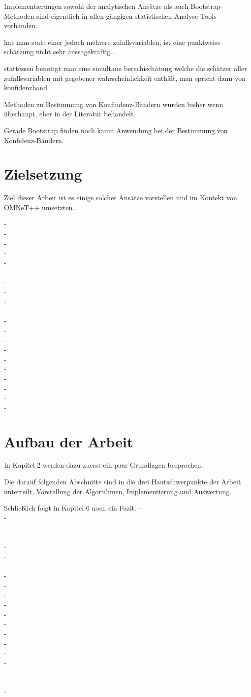 Implementierungen sowohl der analytischen Ansätze als auch Bootstrap-Methoden sind eigentlich in allen gängigen statistischen Analyse-Tools vorhanden. 

hat man statt einer jedoch mehrere zufallsvariablen, ist eine punktweise schätzung nicht sehr aussagekräftig...

stattessen benötigt man eine simultane berechischätung welche die schätzer aller zufallsvariablen mit gegebener wahrscheinlichkeit enthält, man spricht dann von konfidenzband

Methoden zu Bestimmung von Konfindenz-Bändern wurden bisher wenn überhaupt, eher in der Literatur behandelt.

Gerade Bootstrap finden noch kaum Anwendung bei der Bestimmung von Konfidenz-Bändern.

\section{Zielsetzung}
Ziel dieser Arbeit ist es einige solcher Ansätze vorstellen und im Kontekt von OMNeT++ umsetzten.


- \\
- \\
- \\
- \\
- \\
- \\
- \\
- \\
- \\
- \\
- \\
- \\
- \\
- \\
- \\
- \\
- \\
- \\
- \\
- \\

\section{Aufbau der Arbeit}
In Kapitel 2 werden dazu zuerst ein paar Grundlagen besprochen.

Die darauf folgenden Abschnitte sind in die drei Hautschwerpunkte der Arbeit unterteilt, Vorstellung der Algorithmen, Implementierung und Auswertung.

Schließlich folgt in Kapitel 6 noch ein Fazit.
- \\
- \\
- \\
- \\
- \\
- \\
- \\
- \\
- \\
- \\
- \\
- \\
- \\
- \\
- \\
- \\
- \\
- \\
- \\
- \\